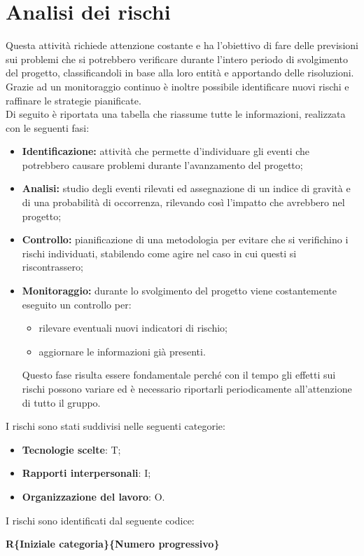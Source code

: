 \section{Analisi dei rischi}
Questa attività richiede attenzione costante e ha l'obiettivo di fare delle previsioni sui problemi che si potrebbero verificare durante l'intero periodo di svolgimento del progetto, classificandoli in base alla loro entità e apportando delle risoluzioni.\\ Grazie ad un monitoraggio continuo è inoltre possibile identificare nuovi rischi e raffinare le strategie pianificate.\\
Di seguito è riportata una tabella che riassume tutte le informazioni, realizzata con le seguenti fasi:
\begin{itemize}
\item \textbf{Identificazione:} attività che permette d'individuare gli eventi che potrebbero causare problemi durante l'avanzamento del progetto;
\item \textbf{Analisi:} studio degli eventi rilevati ed assegnazione di un indice di gravità e di una probabilità di occorrenza, rilevando così l'impatto che avrebbero nel progetto;
\item \textbf{Controllo:} pianificazione di una metodologia per evitare che
si verifichino i rischi individuati, stabilendo come agire nel caso in cui questi si riscontrassero;
\item \textbf{Monitoraggio:} durante lo svolgimento del progetto viene costantemente eseguito un controllo per:
	\begin{itemize}
		\item rilevare eventuali nuovi indicatori di rischio;
		\item aggiornare le informazioni già presenti.
	\end{itemize}
Questo fase risulta essere fondamentale perché con il tempo gli effetti sui rischi possono variare ed è necessario riportarli periodicamente all'attenzione di tutto il gruppo.
\end{itemize}
I rischi sono stati suddivisi nelle seguenti categorie:
\begin{itemize}
\item \textbf{Tecnologie scelte}: T;
\item \textbf{Rapporti interpersonali}: I;
\item \textbf{Organizzazione del lavoro}: O.
\end{itemize}
I rischi sono identificati dal seguente codice:
\begin{center}
	\textbf{R\{Iniziale categoria\}\{Numero progressivo\}}
\end{center}
\newlength\colA\setlength\colA{2cm}
\newlength\colB\setlength\colB{5cm}
\newlength\colC\setlength\colC{3cm}
\newlength\total\setlength\total{\dimexpr\colA+\colB+\colB+\colC+6\tabcolsep\relax}
\renewcommand{\arraystretch}{2}%

